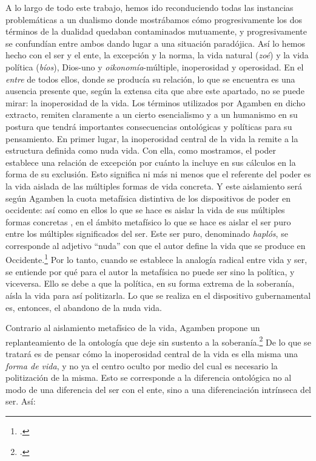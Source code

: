 A lo largo de todo este trabajo, hemos ido reconduciendo todas las instancias problemáticas a un dualismo donde mostrábamos cómo progresivamente los dos términos de la dualidad quedaban contaminados mutuamente, y progresivamente se confundían entre ambos dando lugar a una situación paradójica. Así lo hemos hecho con el ser y el ente, la excepción y la norma, la vida natural (\emph{zoé}) y la vida política (\emph{bíos}), Dios-uno y \emph{oikonomía}-múltiple, inoperosidad y operosidad. En el \emph{entre} de todos ellos, donde se producía su relación, lo que se encuentra es una ausencia presente que, según la extensa cita que abre este apartado, no se puede mirar: la inoperosidad de la vida. Los términos utilizados por Agamben en dicho extracto, remiten claramente a un cierto esencialismo y a un humanismo en su postura que tendrá importantes consecuencias ontológicas y políticas para su pensamiento. En primer lugar, la inoperosidad central de la vida la remite a la estructura definida como nuda vida. Con ella, como mostramos, el poder establece una relación de excepción por cuánto la incluye en sus cálculos en la forma de su exclusión. Esto significa ni más ni menos que el referente del poder es la vida aislada de las múltiples formas de vida concreta. Y este aislamiento será según Agamben la cuota metafísica distintiva de los dispositivos de poder en occidente: así como en ellos lo que se hace es aislar la vida  de sus múltiples formas concretas , en el ámbito metafísico lo que se hace es aislar el ser puro entre los múltiples significados del ser. Este ser puro, denominado \emph{haplós}, se corresponde al adjetivo \enquote{nuda} con que el autor define la vida que se produce en Occidente.\footcite[Véase][96-98]{@7088-GALINDOHERVAS2003} Por lo tanto, cuando se establece la analogía radical entre vida y ser, se entiende por qué para el autor la metafísica no puede ser sino la política, y viceversa. Ello se debe a que la política, en su forma extrema de la soberanía, aísla la vida para así politizarla. Lo que se realiza en el dispositivo gubernamental es, entonces, el abandono de la nuda vida.

Contrario al aislamiento metafísico de la vida, Agamben propone un replanteamiento de la ontología que deje sin sustento a la soberanía.\footcite[Véase][205]{@7088-GALINDOHERVAS2003} De lo que se tratará es de pensar cómo la inoperosidad central de la vida es ella misma una \emph{forma de vida}, y no ya el centro oculto por medio del cual es necesario la politización de la misma. Esto se corresponde a la diferencia ontológica no al modo de una diferencia del ser con el ente, sino a una diferenciación intrínseca del ser. Así:

